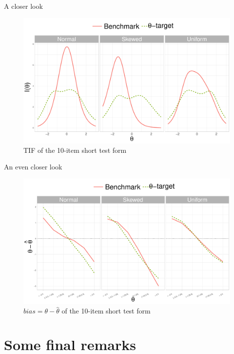 \documentclass{beamer} %
\begin{document}
\begin{frame}{A closer look}
	\begin{figure}
		\centering
		\includegraphics[width=.90\linewidth]{img/infoDetails.pdf}
		\caption{TIF of the 10-item short test form}
	\end{figure}
\end{frame}

\begin{frame}{An even closer look}
	\begin{figure}
		\centering
		\includegraphics[width=.90\linewidth]{img/BIAS.pdf}
		\caption{$bias = \theta - \hat{\theta}$ of the 10-item short test form}
	\end{figure}
\end{frame}

\section[Final remarks]{Some final remarks}
\end{document}
